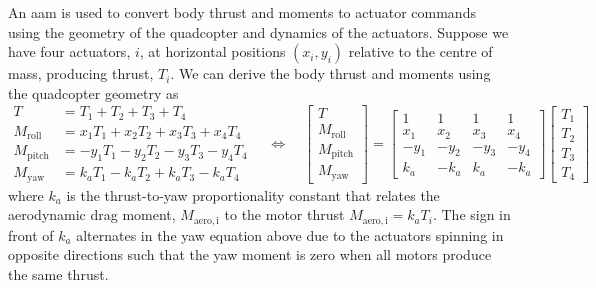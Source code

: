 \documentclass{report_template_oxford}
\begin{document}
An \gls{aam} is used to convert body thrust and moments to actuator commands using the geometry of the quadcopter and dynamics of the actuators. Suppose we have four actuators, $i$, at horizontal positions $(x_i,y_i)$ relative to the centre of mass, producing thrust, $T_i$. We can derive the body thrust and moments using the quadcopter geometry as
\begin{equation}
    \begin{aligned}
        T &= T_1 + T_2 + T_3 + T_4 \\
        M_{\mathrm{roll}} &= x_1 T_1 + x_2 T_2 + x_3 T_3 + x_4 T_4 \\
        M_{\mathrm{pitch}} &= - y_1 T_1 - y_2 T_2 - y_3 T_3 - y_4 T_4 \\
        M_{\mathrm{yaw}} &= k_a T_1 - k_a T_2 + k_a T_3 - k_a T_4
    \end{aligned}
    \quad
    \Longleftrightarrow
    \quad
    \begin{bmatrix}
    T \\
    M_{\mathrm{roll}} \\
    M_{\mathrm{pitch}} \\
    M_{\mathrm{yaw}}
    \end{bmatrix}
    =
    \begin{bmatrix}
    1 & 1 & 1 & 1 \\
    x_1 & x_2 & x_3 & x_4 \\
    - y_1 & - y_2 & - y_3 & - y_4 \\
    k_a & -k_a & k_a & -k_a
    \end{bmatrix}
    \begin{bmatrix}
    T_1 \\ T_2 \\ T_3 \\ T_4
    \end{bmatrix}
\end{equation}
where $k_a$ is the thrust-to-yaw proportionality constant that relates the aerodynamic drag moment, $M_{\mathrm{aero,i}}$ to the motor thrust $M_{\mathrm{aero,i}} = k_a T_i$. The sign in front of $k_a$ alternates in the yaw equation above due to the actuators spinning in opposite directions such that the yaw moment is zero when all motors produce the same thrust.
\end{document}
